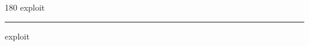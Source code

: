 
\begin{frame}
\begin{center}
\begin{turn}{180}
{\fontsize{2.5cm}{1em}\selectfont exploit}
\end{turn}
\vspace{1em}\par  
\hrule
\vspace{1em}\par  
{\fontsize{2.5cm}{1em}\selectfont exploit}
\end{center}
\end{frame}

